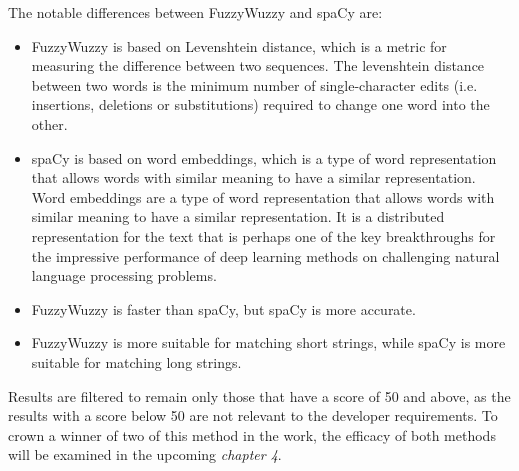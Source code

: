 The notable differences between FuzzyWuzzy and spaCy are:
\begin{itemize}
    \item FuzzyWuzzy is based on Levenshtein distance, which is a metric for measuring the difference between two sequences. The levenshtein distance between two words is the minimum number of single-character edits (i.e. insertions, deletions or substitutions) required to change one word into the other.
    \item spaCy is based on word embeddings, which is a type of word representation that allows words with similar meaning to have a similar representation. Word embeddings are a type of word representation that allows words with similar meaning to have a similar representation. It is a distributed representation for the text that is perhaps one of the key breakthroughs for the impressive performance of deep learning methods on challenging natural language processing problems.
    \item  FuzzyWuzzy is faster than spaCy, but spaCy is more accurate.
    \item  FuzzyWuzzy is more suitable for matching short strings, while spaCy is more suitable for matching long strings.
\end{itemize}

Results are filtered to remain only those that have a score of 50 and above, as the results with a score below 50 are not relevant to the developer requirements. To crown a winner of two of this method in the work, the efficacy of both methods will be examined in the upcoming \emph{chapter 4}.




